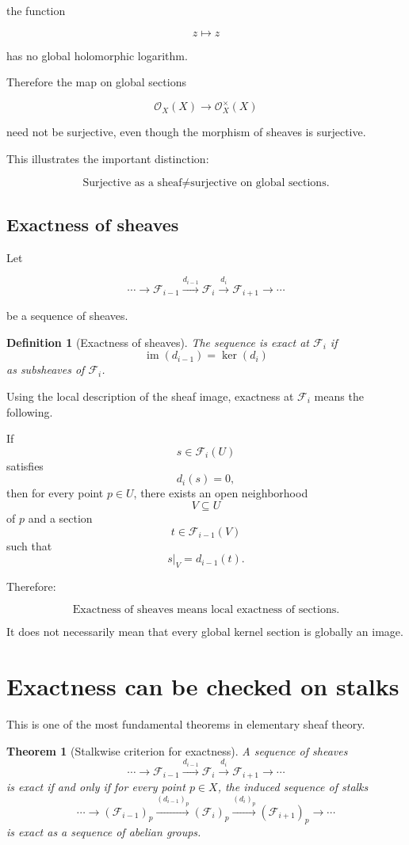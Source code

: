 \documentclass[12pt,a4paper]{article}
\newtheorem{theorem}{Theorem}[section]
\newtheorem{definition}{Definition}[section]
\newcommand{\im}{\operatorname{im}}
\begin{document}
the function

\[
z \longmapsto z
\]

has no global holomorphic logarithm.

Therefore the map on global sections

\[
\mathcal O_X(X)
\longrightarrow
\mathcal O_X^\times(X)
\]

need not be surjective, even though the morphism of sheaves is surjective.

This illustrates the important distinction:

\[
\boxed{
	\text{Surjective as a sheaf}
	\neq
	\text{surjective on global sections.}
}
\]

\subsection{Exactness of sheaves}

Let

\[
\cdots
\longrightarrow
\mathcal F_{i-1}
\xrightarrow{d_{i-1}}
\mathcal F_i
\xrightarrow{d_i}
\mathcal F_{i+1}
\longrightarrow
\cdots
\]

be a sequence of sheaves.

\begin{definition}[Exactness of sheaves]
	The sequence is exact at $\mathcal F_i$ if
	\[
	\im(d_{i-1})=\ker(d_i)
	\]
	as subsheaves of $\mathcal F_i$.
\end{definition}

Using the local description of the sheaf image, exactness at $\mathcal F_i$
means the following.

If
\[
s \in \mathcal F_i(U)
\]
satisfies
\[
d_i(s)=0,
\]
then for every point $p \in U$, there exists an open neighborhood
\[
V \subseteq U
\]
of $p$ and a section
\[
t \in \mathcal F_{i-1}(V)
\]
such that
\[
s|_V=d_{i-1}(t).
\]

Therefore:

\[
\boxed{
	\text{Exactness of sheaves means local exactness of sections.}
}
\]

It does not necessarily mean that every global kernel section is globally an
image.

\section{Exactness can be checked on stalks}

This is one of the most fundamental theorems in elementary sheaf theory.

\begin{theorem}[Stalkwise criterion for exactness]
	A sequence of sheaves
	\[
	\cdots
	\longrightarrow
	\mathcal F_{i-1}
	\xrightarrow{d_{i-1}}
	\mathcal F_i
	\xrightarrow{d_i}
	\mathcal F_{i+1}
	\longrightarrow
	\cdots
	\]
	is exact if and only if for every point $p \in X$, the induced sequence of
	stalks
	\[
	\cdots
	\longrightarrow
	(\mathcal F_{i-1})_p
	\xrightarrow{(d_{i-1})_p}
	(\mathcal F_i)_p
	\xrightarrow{(d_i)_p}
	(\mathcal F_{i+1})_p
	\longrightarrow
	\cdots
	\]
	is exact as a sequence of abelian groups.
\end{theorem}
\end{document}
